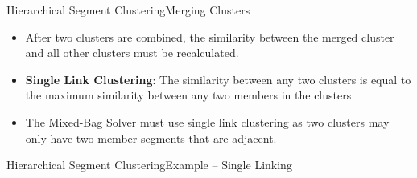 \documentclass[10pt]{beamer}
\begin{document}
\begin{frame}{Hierarchical Segment Clustering}{Merging Clusters}
  \begin{itemize}
    \item After two clusters are combined, the similarity between the merged cluster and all other clusters must be recalculated.
    \vfill
    \item \textbf{Single Link Clustering}: The similarity between any two clusters is equal to the maximum similarity between any two members in the clusters~\cite{tanIntroToDataMining}
    \vfill
    \item The Mixed-Bag Solver must use single link clustering as two clusters may only have two member segments that are adjacent.
  \end{itemize}
\end{frame}




\begin{frame}{Hierarchical Segment Clustering}{Example -- Single Linking}
  \begin{center}
    \vfill    
  \end{center}
\end{frame}
\end{document}
